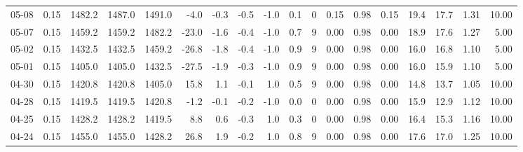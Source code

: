 \begin{threeparttable}
{\begin{tabular}{lrrrrrrrrrrrrrrrrr}
  05-08 &     0.15 & 1482.2 & 1487.0 & 1491.0 &       -4.0 &           -0.3 &                      -0.5 &                     -1.0 &                 0.1 &              0 &       0.15 &      0.98 &           0.15 &             19.4 &                17.7 &            1.31 &                  10.00 \\
  05-07 &     0.15 & 1459.2 & 1459.2 & 1482.2 &      -23.0 &           -1.6 &                      -0.4 &                     -1.0 &                 0.7 &              9 &       0.00 &      0.98 &           0.00 &             18.9 &                17.6 &            1.27 &                   5.00 \\
  05-02 &     0.15 & 1432.5 & 1432.5 & 1459.2 &      -26.8 &           -1.8 &                      -0.4 &                     -1.0 &                 0.9 &              9 &       0.00 &      0.98 &           0.00 &             16.0 &                16.8 &            1.10 &                   5.00 \\
  05-01 &     0.15 & 1405.0 & 1405.0 & 1432.5 &      -27.5 &           -1.9 &                      -0.3 &                     -1.0 &                 0.9 &              9 &       0.00 &      0.98 &           0.00 &             16.0 &                15.9 &            1.10 &                   5.00 \\
  04-30 &     0.15 & 1420.8 & 1420.8 & 1405.0 &       15.8 &            1.1 &                      -0.1 &                      1.0 &                 0.5 &              9 &       0.00 &      0.98 &           0.00 &             14.8 &                13.7 &            1.05 &                  10.00 \\
  04-28 &     0.15 & 1419.5 & 1419.5 & 1420.8 &       -1.2 &           -0.1 &                      -0.2 &                     -1.0 &                 0.0 &              0 &       0.00 &      0.98 &           0.00 &             15.9 &                12.9 &            1.12 &                  10.00 \\
  04-25 &     0.15 & 1428.2 & 1428.2 & 1419.5 &        8.8 &            0.6 &                      -0.3 &                      1.0 &                 0.3 &              0 &       0.00 &      0.98 &           0.00 &             16.4 &                15.3 &            1.16 &                  10.00 \\
  04-24 &     0.15 & 1455.0 & 1455.0 & 1428.2 &       26.8 &            1.9 &                      -0.2 &                      1.0 &                 0.8 &              9 &       0.00 &      0.98 &           0.00 &             17.6 &                17.0 &            1.25 &                  10.00 \\

\end{tabular}}
\end{threeparttable}
